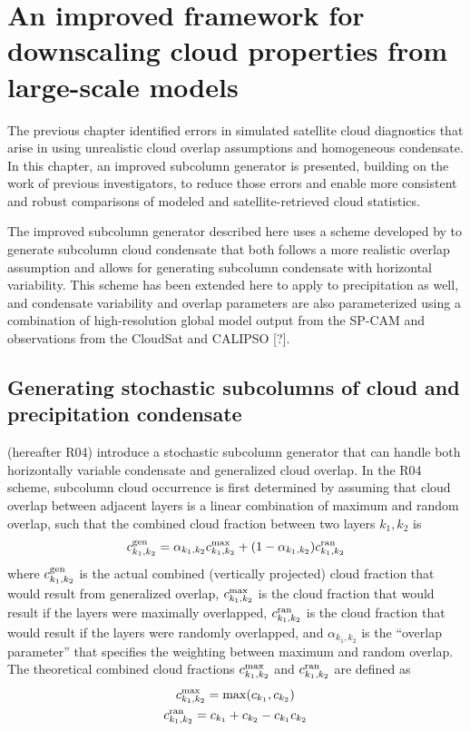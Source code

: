 \chapter{An improved framework for downscaling cloud properties from large-scale models}\label{sgi_chapter}
The previous chapter identified errors in simulated satellite cloud diagnostics that arise in using unrealistic cloud overlap assumptions and homogeneous condensate. In this chapter, an improved subcolumn generator is presented, building on the work of previous investigators, to reduce those errors and enable more consistent and robust comparisons of modeled and satellite-retrieved cloud statistics. 

The improved subcolumn generator described here uses a scheme developed by \cite{raisanen_et_al_2004} to generate subcolumn cloud condensate that both follows a more realistic overlap assumption and allows for generating subcolumn condensate with horizontal variability. This scheme has been extended here to apply to precipitation as well, and condensate variability and overlap parameters are also parameterized using a combination of high-resolution global model output from the SP-CAM and observations from the CloudSat and CALIPSO [?].

\section{Generating stochastic subcolumns of cloud and precipitation condensate}
\label{subgrid2_generator_section}
\cite{raisanen_et_al_2004} (hereafter R04) introduce a stochastic subcolumn generator that can handle both horizontally variable condensate and generalized cloud overlap. In the R04 scheme, subcolumn cloud occurrence is first determined by assuming that cloud overlap between adjacent layers is a linear combination of maximum and random overlap, such that the combined cloud fraction between two layers $k_1, k_2$ is
\begin{gather}
c_{k_1, k_2}^{\rm gen} = \alpha_{k_1, k_2} c_{k_1, k_2}^{\rm max} + (1 - \alpha_{k_1, k_2})
c_{k_1, k_2}^{\rm ran}
    \label{generalized_overlap_equation}
\end{gather}
where $c_{k_1, k_2}^{\rm gen}$ is the actual combined (vertically projected) cloud fraction that would result from generalized overlap, $c_{k_1, k_2}^{\rm max}$ is the cloud fraction that would result if the layers were maximally overlapped, $c_{k_1, k_2}^{\rm ran}$ is the cloud fraction that would result if the layers were randomly overlapped, and $\alpha_{k_1, k_2}$ is the ``overlap parameter'' that specifies the weighting between maximum and random overlap. The theoretical combined cloud fractions $c^{\rm max}_{k_1, k_2}$ and $c^{\rm ran}_{k_1, k_2}$ are defined as
\begin{gather}
    c^{\rm max}_{k_1, k_2} = \max(c_{k_1}, c_{k_2}) \\
    c^{\rm ran}_{k_1, k_2} = c_{k_1} + c_{k_2} - c_{k_1} c_{k_2}
\end{gather}

